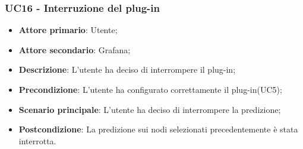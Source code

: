 \subsubsection{UC16 - Interruzione del plug-in}
\label{sssec:uc16}
\begin{itemize}
  \item \textbf{Attore primario}: Utente;
  \item \textbf{Attore secondario}: Grafana;
  \item \textbf{Descrizione}: L'utente ha deciso di interrompere il plug-in;
  \item \textbf{Precondizione}: L'utente ha configurato correttamente il plug-in(UC5);
  \item \textbf{Scenario principale}: L'utente ha deciso di interrompere la predizione;
  \item \textbf{Postcondizione}: La predizione sui nodi selezionati precedentemente è stata interrotta.
\end{itemize}
